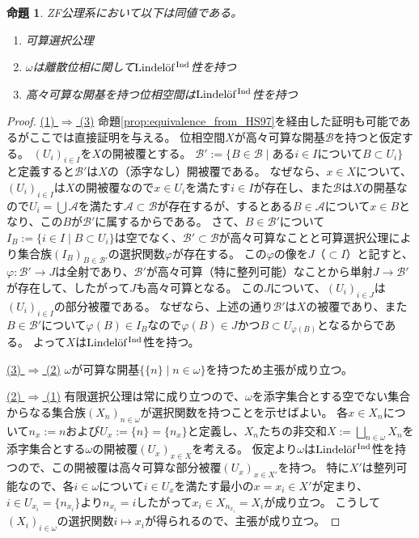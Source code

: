 \documentclass{jarticle}
\newtheorem{proposition}{命題}
\newcommand{\WithIndex}[1]{$\textrm{#1}{}^{\,\textrm{\scriptsize Ind}}$}
\begin{document}
\begin{proposition}
\label{prop:indexed_version_of_HS97}
ZF公理系において以下は同値である。
\begin{enumerate}
\item
可算選択公理
\item
$\omega$は離散位相に関して\WithIndex{Lindel\"{o}f}性を持つ
\item
高々可算な開基を持つ位相空間は\WithIndex{Lindel\"{o}f}性を持つ
\end{enumerate}
\end{proposition}
\begin{proof}
\underline{(1) $\Rightarrow$ (3)}
命題\ref{prop:equivalence_from_HS97}を経由した証明も可能であるがここでは直接証明を与える。
位相空間$X$が高々可算な開基$\mathcal{B}$を持つと仮定する。
$(U_i)_{i \in I}$を$X$の開被覆とする。
$\mathcal{B}' := \{B \in \mathcal{B} \mid \mbox{ある$i \in I$について$B \subset U_i$}\}$と定義すると$\mathcal{B}'$は$X$の（添字なし）開被覆である。
なぜなら、$x \in X$について、$(U_i)_{i \in I}$は$X$の開被覆なので$x \in U_i$を満たす$i \in I$が存在し、また$\mathcal{B}$は$X$の開基なので$U_i = \bigcup \mathcal{A}$を満たす$\mathcal{A} \subset \mathcal{B}$が存在するが、するとある$B \in \mathcal{A}$について$x \in B$となり、この$B$が$\mathcal{B}'$に属するからである。
さて、$B \in \mathcal{B}'$について$I_B := \{i \in I \mid B \subset U_i\}$は空でなく、$\mathcal{B}' \subset \mathcal{B}$が高々可算なことと可算選択公理により集合族$(I_B)_{B \in \mathcal{B}'}$の選択関数$\varphi$が存在する。
この$\varphi$の像を$J$（$\subset I$）と記すと、$\varphi \colon \mathcal{B}' \to J$は全射であり、$\mathcal{B}'$が高々可算（特に整列可能）なことから単射$J \to \mathcal{B}'$が存在して、したがって$J$も高々可算となる。
この$J$について、$(U_i)_{i \in J}$は$(U_i)_{i \in I}$の部分被覆である。
なぜなら、上述の通り$\mathcal{B}'$は$X$の被覆であり、また$B \in \mathcal{B}'$について$\varphi(B) \in I_B$なので$\varphi(B) \in J$かつ$B \subset U_{\varphi(B)}$となるからである。
よって$X$は\WithIndex{Lindel\"{o}f}性を持つ。

\underline{(3) $\Rightarrow$ (2)}
$\omega$が可算な開基$\{\{n\} \mid n \in \omega\}$を持つため主張が成り立つ。

\underline{(2) $\Rightarrow$ (1)}
有限選択公理は常に成り立つので、$\omega$を添字集合とする空でない集合からなる集合族$(X_n)_{n \in \omega}$が選択関数を持つことを示せばよい。
各$x \in X_n$について$n_x := n$および$U_x := \{n\} = \{n_x\}$と定義し、$X_n$たちの非交和$X := \bigsqcup_{n \in \omega} X_n$を添字集合とする$\omega$の開被覆$(U_x)_{x \in X}$を考える。
仮定より$\omega$は\WithIndex{Lindel\"{o}f}性を持つので、この開被覆は高々可算な部分被覆$(U_x)_{x \in X'}$を持つ。
特に$X'$は整列可能なので、各$i \in \omega$について$i \in U_x$を満たす最小の$x = x_i \in X'$が定まり、$i \in U_{x_i} = \{n_{x_i}\}$より$n_{x_i} = i$したがって$x_i \in X_{n_{x_i}} = X_i$が成り立つ。
こうして$(X_i)_{i \in \omega}$の選択関数$i \mapsto x_i$が得られるので、主張が成り立つ。
\end{proof}
\end{document}
